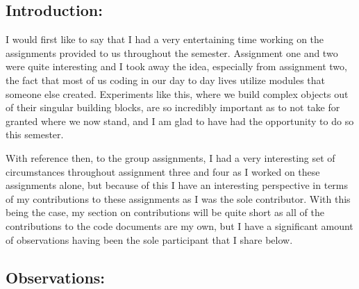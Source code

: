 \documentclass{article}
\theoremstyle{theorem}
\theoremstyle{definition}
\theoremstyle{remark}
\begin{document}
  \subsection*{Introduction:}
  I would first like to say that I had a very entertaining time working on the assignments provided to us 
  throughout the semester. Assignment one and two were quite interesting and I took away the idea, especially 
  from assignment two, the fact that most of us coding in our day to day lives utilize modules that someone else 
  created. Experiments like this, where we build complex objects out of their singular building blocks, are so 
  incredibly important as to not take for granted where we now stand, and I am glad to have had the opportunity 
  to do so this semester. 
  
  With reference then, to the group assignments, I had a very interesting set of circumstances throughout
  assignment three and four as I worked on these assignments alone, but because of this I have an interesting 
  perspective in terms of my contributions to these assignments as I was the sole contributor. With this being the 
  case, my section on contributions will be quite short as all of the contributions to the code documents are my own, 
  but I have a significant amount of observations having been the sole participant that I share below.
  \subsection*{Observations:}
\end{document}
